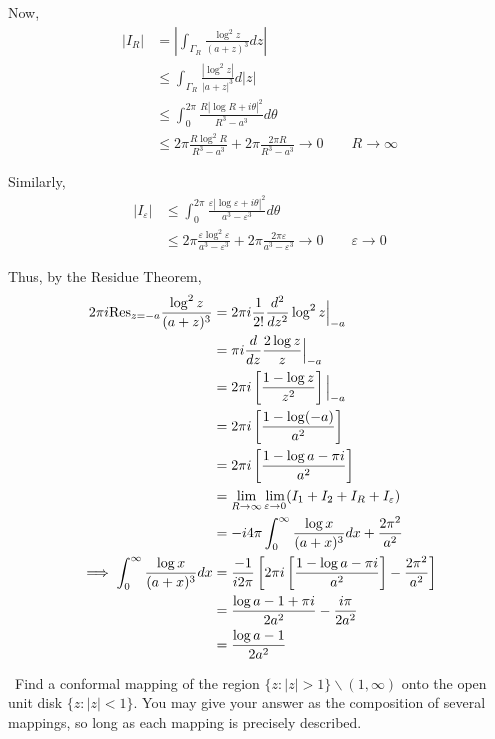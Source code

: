 \documentclass[12pt]{Qual}
\begin{document}
\begin{solution}
Now, \begin{align*}
    |I_R|&=\left|\int_{\Gamma_R}\frac{\log^2z}{(a+z)^3}dz\right|\\
    &\le\int_{\Gamma_R}\frac{|\log^2 z|}{|a+z|^3}d|z|\\
    &\le\int_0^{2\pi}\frac{R|\log R+i\theta|^2}{R^3-a^3}d\theta\\
    &\le 2\pi\frac{R\log^2R}{R^3-a^3}+2\pi\frac{2\pi R}{R^3-a^3}\to0\qquad R\to\infty
\end{align*}

Similarly, \begin{align*}
    |I_\varepsilon|&\le\int_0^{2\pi}\frac{\varepsilon|\log \varepsilon+i\theta|^2}{a^3-\varepsilon^3}d\theta\\
    &\le 2\pi\frac{\varepsilon\log^2\varepsilon}{a^3-\varepsilon^3}+2\pi\frac{2\pi \varepsilon}{a^3-\varepsilon^3}\to0\qquad \varepsilon\to0
\end{align*}

Thus, by the Residue Theorem, \begin{align*}
    2\pi i\text{Res}_{z=-a}\frac{\log^2 z}{(a+z)^3}&=2\pi i \frac{1}{2!}\frac{d^2}{dz^2}\log^2z\Big|_{-a}\\
    &=\pi i\frac{d}{dz}\frac{2\log z}{z}\Big|_{-a}\\
    &=2\pi i\left[\frac{1-\log z}{z^2}\right]\Big|_{-a}\\
    &=2\pi i\left[\frac{1-\log(-a)}{a^2}\right]\\
    &=2\pi i\left[\frac{1-\log a-\pi i}{a^2}\right]\\
    &=\lim_{R\to\infty}\lim_{\varepsilon\to 0}(I_1+I_2+I_R+I_\varepsilon)\\
    &=-i4\pi\int_0^\infty\frac{\log x}{(a+x)^3}dx+\frac{2\pi^2}{a^2}\\
    \implies \int_0^\infty\frac{\log x}{(a+x)^3}dx&=\frac{-1}{i2\pi}\left[2\pi i\left[\frac{1-\log a-\pi i}{a^2}\right]-\frac{2\pi^2}{a^2}\right]\\
    &=\frac{\log a-1+\pi i}{2a^2}-\frac{i\pi}{2a^2}\\
    &=\frac{\log a-1}{2a^2}
\end{align*}
\end{solution}
\newpage



\begin{problem} $\,$
Find a conformal mapping of the region $\{z:|z|>1\}\backslash(1,\infty)$ onto the open unit disk $\{z:|z|<1\}.$ You may give your answer as the composition of several mappings, so long as each mapping is precisely described.
\end{problem}
\end{document}
